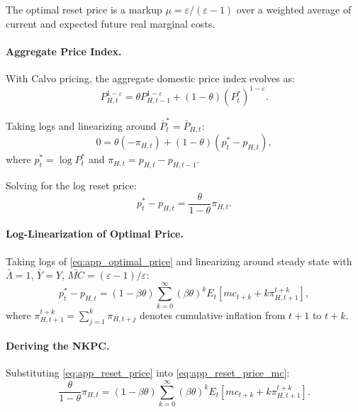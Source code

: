 \documentclass[12pt,a4paper]{article}
\begin{document}
\begin{appendices}
The optimal reset price is a markup $\mu = \varepsilon/(\varepsilon-1)$ over a weighted average of current and expected future real marginal costs.

\paragraph{Aggregate Price Index.}
With Calvo pricing, the aggregate domestic price index evolves as:
\begin{equation}
	P_{H,t}^{1-\varepsilon} = \theta P_{H,t-1}^{1-\varepsilon} + (1-\theta)(P_t^*)^{1-\varepsilon}.
	\label{eq:app_price_index}
\end{equation}

Taking logs and linearizing around $\bar{P}_t^* = \bar{P}_{H,t}$:
\begin{equation}
	0 = \theta(-\pi_{H,t}) + (1-\theta)(p_t^* - p_{H,t}),
	\label{eq:app_price_index_log}
\end{equation}
where $p_t^* = \log P_t^*$ and $\pi_{H,t} = p_{H,t} - p_{H,t-1}$.

Solving for the log reset price:
\begin{equation}
	p_t^* - p_{H,t} = \frac{\theta}{1-\theta}\pi_{H,t}.
	\label{eq:app_reset_price}
\end{equation}

\paragraph{Log-Linearization of Optimal Price.}
Taking logs of \eqref{eq:app_optimal_price} and linearizing around steady state with $\bar{\Lambda} = 1$, $\bar{Y} = Y$, $\bar{MC} = (\varepsilon-1)/\varepsilon$:
\begin{equation}
	p_t^* - p_{H,t} = (1-\beta\theta) \sum_{k=0}^\infty (\beta\theta)^k E_t [mc_{t+k} + k\pi_{H,t+1}^{t+k}],
	\label{eq:app_reset_price_mc}
\end{equation}
where $\pi_{H,t+1}^{t+k} = \sum_{j=1}^k \pi_{H,t+j}$ denotes cumulative inflation from $t+1$ to $t+k$.

\paragraph{Deriving the NKPC.}
Substituting \eqref{eq:app_reset_price} into \eqref{eq:app_reset_price_mc}:
\begin{equation}
	\frac{\theta}{1-\theta}\pi_{H,t} = (1-\beta\theta) \sum_{k=0}^\infty (\beta\theta)^k E_t [mc_{t+k} + k\pi_{H,t+1}^{t+k}].
	\label{eq:app_nkpc_derivation}
\end{equation}


\end{appendices}
\end{document}

